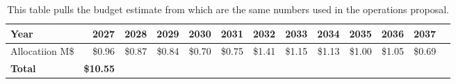 \tiny \begin{longtable} {|l  |r  |r  |r  |r  |r  |r  |r  |r  |r  |r  |r  |r |} \caption{This table pulls the budget estimate from  which are the same numbers used in the operations proposal. \label{tab:chileBudget}}\\ 
\hline 
\textbf{Year}&\textbf{2027}&\textbf{2028}&\textbf{2029}&\textbf{2030}&\textbf{2031}&\textbf{2032}&\textbf{2033}&\textbf{2034}&\textbf{2035}&\textbf{2036}&\textbf{2037} \\ \hline
{Allocatiion M\$}&{\$0.96}&{\$0.87}&{\$0.84}&{\$0.70}&{\$0.75}&{\$1.41}&{\$1.15}&{\$1.13}&{\$1.00}&{\$1.05}&{\$0.69} \\ \hline
\textbf{Total }&\textbf{\$10.55}&&&&&&&&&& \\ \hline
\end{longtable} \normalsize
